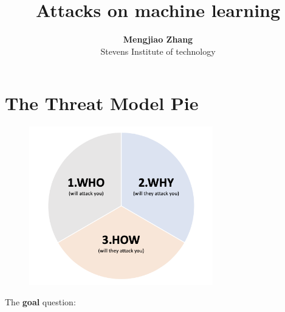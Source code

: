 \documentclass[11pt]{article}
\numberwithin{equation}{section}
\begin{document}


\title{Attacks on machine learning}

\author{\textbf{Mengjiao Zhang} \\ Stevens Institute of technology}


\maketitle







\section{The Threat Model Pie} \label{sec:optimization}

\begin{figure}[!h]
	\centering
	\includegraphics[width=8cm]{figures/Threat_Model_Pie.png}
	\label{fig:Pie}
\end{figure}

The \textbf{goal} question:
\end{document}

